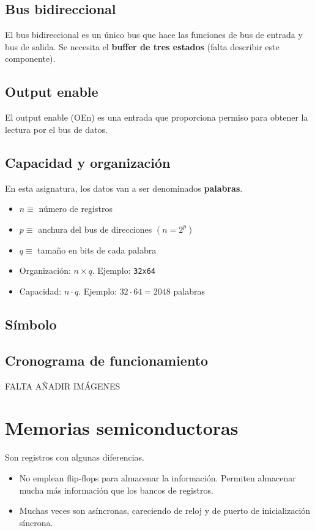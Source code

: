 \documentclass[a4paper]{book}
\begin{document}
\subsection{Bus bidireccional}

El bus bidireccional es un único bus que hace las funciones de bus de entrada y bus de salida. Se necesita el \textbf{buffer de tres estados} (falta describir este componente).

\subsection{Output enable}

El output enable (OEn) es una entrada que proporciona permiso para obtener la lectura por el bus de datos.

\subsection{Capacidad y organización}

En esta asignatura, los datos van a ser denominados \textbf{palabras}.
\begin{itemize}
	\item $n \equiv $ número de registros
	\item $p \equiv $ anchura del bus de direcciones $\left( n=2^p \right)$
	\item $q \equiv $ tamaño en bits de cada palabra
	\item Organización: $n\times q$. Ejemplo: \verb|32x64|
	\item Capacidad: $n\cdot q$. Ejemplo: $32 \cdot 64 = 2048$ palabras
\end{itemize}

\subsection{Símbolo}

\subsection{Cronograma de funcionamiento}

FALTA AÑADIR IMÁGENES

\section{Memorias semiconductoras}

Son registros con algunas diferencias.
\begin{itemize}
	\item No emplean flip-flops para almacenar la información. Permiten almacenar mucha más información que los bancos de registros.
	\item Muchas veces son asíncronas, careciendo de reloj y de puerto de inicialización síncrona.
\end{itemize}
\end{document}
